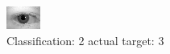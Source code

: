 \begin{figure}[h!]
\begin{center}
\includegraphics[width=0.60\columnwidth]{figures/ID526_class_2_target_3.png}
\end{center}
\caption{ Classification: 2 actual target: 3}
\label{fig:ID526_class_2_target_3}
\end{figure}
